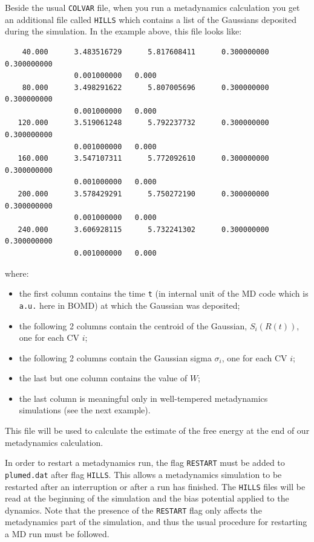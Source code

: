 \documentclass[12pt,a4paper]{article}
\begin{document}
Beside the usual \texttt{COLVAR} file, when you run a metadynamics calculation you get an additional file called \texttt{HILLS} which contains a list of the Gaussians deposited during the simulation. In the example above, this file looks like:

\begin{verbatim}
    40.000      3.483516729      5.817608411      0.300000000      0.300000000
                0.001000000   0.000 
    80.000      3.498291622      5.807005696      0.300000000      0.300000000
                0.001000000   0.000 
   120.000      3.519061248      5.792237732      0.300000000      0.300000000
                0.001000000   0.000 
   160.000      3.547107311      5.772092610      0.300000000      0.300000000
                0.001000000   0.000 
   200.000      3.578429291      5.750272190      0.300000000      0.300000000
                0.001000000   0.000 
   240.000      3.606928115      5.732241302      0.300000000      0.300000000
                0.001000000   0.000 
\end{verbatim}

where:

\begin{itemize}
\item the first column contains the time \texttt{t} (in internal unit of the MD code which is \texttt{a.u.} here in BOMD) at which the Gaussian was deposited;
\item the following 2 columns contain the centroid of the Gaussian, $S_{i}(R(t))$, one for each CV $i$;
\item the following 2 columns contain the Gaussian sigma $\sigma_{i}$, one for each CV $i$;
\item the last but one column contains the value of $W$;
\item the last column is meaningful only in well-tempered metadynamics simulations (see the next example).
\end{itemize}

This file will be used to calculate the estimate of the free energy at the end of our metadynamics calculation.

In order to restart a metadynamics run, the flag \texttt{RESTART} must be added to \texttt{plumed.dat} after flag \texttt{HILLS}. This allows a metadynamics simulation to be restarted after an interruption or after a run has finished. The \texttt{HILLS} files will be read at the beginning of the simulation and the bias potential applied to the dynamics. Note that the presence of the \texttt{RESTART} flag only affects the metadynamics part of the simulation, and thus the usual procedure for restarting a MD run must be followed.
\end{document}

